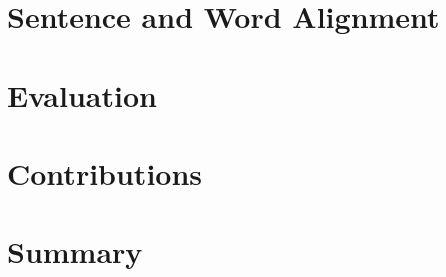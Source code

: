 




\tableofcontents



\chapter{Sentence and Word Alignment}

\chapter{Evaluation}
\chapter{Contributions}
\chapter{Summary}

%
\printbibliography
